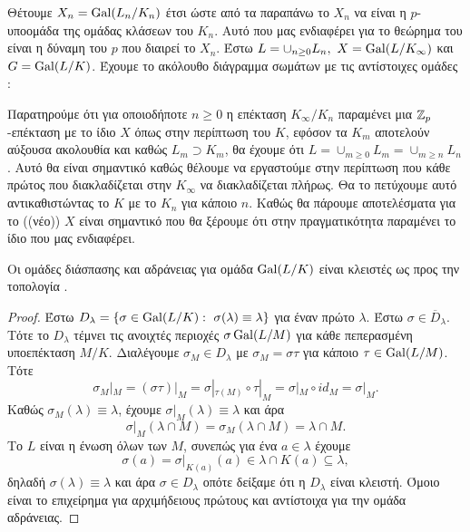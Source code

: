 \noindent Θέτουμε $X_n = \operatorname{Gal}(L_n/K_n)$ έτσι ώστε από τα παραπάνω το $X_n$ να είναι η $p$- υποομάδα της ομάδας κλάσεων του $K_n$. Αυτό που μας ενδιαφέρει για το θεώρημα του  είναι η δύναμη του $p$ που διαιρεί το $X_n$. Έστω $L=\cup_{n\geq 0} L_n, \ X = \operatorname{Gal}(L/K_{\infty})$ και $G = \operatorname{Gal}(L/K)$. Έχουμε το ακόλουθο διάγραμμα σωμάτων με τις αντίστοιχες ομάδες :

\begin{figure}[H]
    \centering
\end{figure}

\noindent Παρατηρούμε ότι για οποιοδήποτε $n\geq 0$ η επέκταση $K_\infty /K_n$ παραμένει μια $\mathbb{Z}_p$-επέκταση με το ίδιο $X$ όπως στην 
περίπτωση του $K$, εφόσον τα $K_m$ αποτελούν αύξουσα ακολουθία και καθώς $L_m \supset K_m$, θα έχουμε ότι $L = \cup_{m\geq 0} 
L_m = \cup_{m\geq n} L_n$. Αυτό θα είναι σημαντικό καθώς θέλουμε να εργαστούμε στην περίπτωση που κάθε πρώτος που διακλαδίζεται στην 
$K_\infty$ να διακλαδίζεται πλήρως. Θα το πετύχουμε αυτό αντικαθιστώντας το $K$ με το $K_n$ για κάποιο $n$. Καθώς θα πάρουμε 
αποτελέσματα για το ((νέο)) $X$ είναι σημαντικό που θα ξέρουμε ότι στην πραγματικότητα παραμένει το ίδιο που μας ενδιαφέρει. 

\begin{lemma} Οι ομάδες διάσπασης και αδράνειας για ομάδα $\operatorname{Gal}(L/K)$ είναι κλειστές ως προς την τοπολογία .
\end{lemma}
\begin{proof} Έστω $D_{\lambda}  = \{ \sigma \in \operatorname{Gal}(L/K): \ \sigma (\lambda) \equiv \lambda \}$ για έναν πρώτο $\lambda$. Έστω $\sigma \in \overline{D}_{\lambda}$. Τότε το $D_{\lambda}$ τέμνει τις ανοιχτές περιοχές $\sigma \operatorname{Gal}(L/M)$ για κάθε πεπερασμένη υποεπέκταση $M/K$. Διαλέγουμε $\sigma_M \in D_{\lambda}$ με $\sigma_M = \sigma \tau$ για κάποιο $\tau \in \operatorname{Gal}(L/M)$. Τότε
    $$\sigma_M |_M = (\sigma \tau)|_M = \sigma|_{\tau(M)} \circ \tau|_M = \sigma|_M \circ id_M = \sigma|_M.$$
    Καθώς $\sigma_M(\lambda)\equiv \lambda$, έχουμε $\sigma|_M (\lambda) \equiv \lambda$ και άρα
    $$\sigma|_M(\lambda \cap M) = \sigma_M(\lambda\cap M) = \lambda \cap M.$$
    Το $L$ είναι η ένωση όλων των $M$, συνεπώς για ένα $a \in \lambda$ έχουμε
    $$\sigma(a) = \sigma|_{K(a)}(a) \in \lambda \cap K(a) \subseteq \lambda ,$$
    δηλαδή $\sigma (\lambda)\equiv \lambda$ και άρα $\sigma \in D_{\lambda}$ οπότε δείξαμε ότι η $D_{\lambda}$ είναι κλειστή. Όμοιο είναι το επιχείρημα για αρχιμήδειους πρώτους και αντίστοιχα για την ομάδα αδράνειας.
\end{proof}


